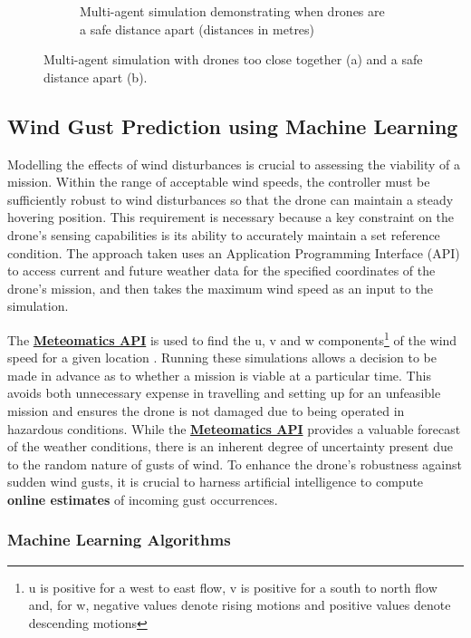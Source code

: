\begin{figure}[H]
\begin{subfigure}[b]{0.48\textwidth}
        \caption{Multi-agent simulation demonstrating when drones are a safe distance apart (distances in metres)}
        \label{fig:1b}
    \end{subfigure}
    \caption{Multi-agent simulation with drones too close together (a) and a safe distance apart (b).}
    \label{fig:dronemulti}
\end{figure}

\newpage


\subsection{Wind Gust Prediction using Machine Learning}
\label{gust}
Modelling the effects of wind disturbances is crucial to assessing the viability of a mission. Within the range of acceptable wind speeds, the controller must be sufficiently robust to wind disturbances so that the drone can maintain a steady hovering position. This requirement is necessary because a key constraint on the drone's sensing capabilities is its ability to accurately maintain a set reference condition. The approach taken uses an Application Programming Interface (API) to access current and future weather data for the specified coordinates of the drone's mission, and then takes the maximum wind speed as an input to the simulation. 

The \href{https://www.meteomatics.com/}{\textbf{Meteomatics API}}  is used to find the u, v and w components\footnote{u is positive for a west to east flow, v is positive for a south to north flow and, for w, negative values denote rising motions and positive values denote descending motions} of the wind speed for a given location \cite{meteomatics_wind_speed}. Running these simulations allows a decision to be made in advance as to whether a mission is viable at a particular time. This avoids both unnecessary expense in travelling and setting up for an unfeasible mission and ensures the drone is not damaged due to being operated in hazardous conditions. While the \href{https://www.meteomatics.com/}{\textbf{Meteomatics API}}
provides a valuable forecast of the weather conditions, there is an inherent degree of uncertainty present due to the random nature of gusts of wind. To enhance the drone's robustness against sudden wind gusts, it is crucial to harness artificial intelligence to compute \textbf{online estimates} of incoming gust occurrences. 

\subsubsection{Machine Learning Algorithms}

